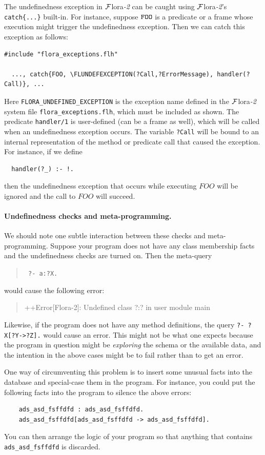 \documentclass[11pt]{article}
\newcommand{\FLSYSTEM}{{\mbox{\sc ${\cal F}${lora}\rm\emph{-2}}}\xspace}
\newcommand{\FLUNDEFEXCEPTION}{FLORA\_UNDEFINED\_EXCEPTION}
\newcommand{\errorsystem}{Flora-2}
\begin{document}
The undefinedness exception in \FLSYSTEM can be caught using \FLSYSTEM's {\tt
  catch\{...\}} built-in. For instance, suppose
$\tt FOO$ is a predicate or a frame whose execution might trigger the
undefinedness exception. Then we can catch this exception as follows:
\begin{verbatim}
#include "flora_exceptions.flh"

  ..., catch{FOO, \FLUNDEFEXCEPTION(?Call,?ErrorMessage), handler(?Call)}, ...
\end{verbatim}
Here {\tt \FLUNDEFEXCEPTION} is the exception name defined in the
\FLSYSTEM system file {\tt flora\_exceptions.flh}, which must be included as
shown.
The predicate {\tt handler/1} is user-defined (can be a frame as well),
which will be called when an undefinedness exception occurs. The variable
{\tt ?Call} will be bound to an internal representation of the method or
predicate call that caused the exception. For instance, if we define
\begin{verbatim}
  handler(?_) :- !.  
\end{verbatim}
then the undefinedness exception that occurs while executing $FOO$ will be
ignored and the call to $FOO$ will succeed.


\paragraph{Undefinedness checks and meta-programming.}
We should note one subtle interaction between these checks and
meta-programming. Suppose your program does not have any class membership
facts and the undefinedness checks are turned on. Then the meta-query
\begin{quote}
 {\tt
       ?- a:?X.
 }
\end{quote}
would cause the following error:
\begin{quote}
 ++Error[\errorsystem]: Undefined class ?:? in user module main  
\end{quote}
Likewise, if the program does not have any method definitions,
the query {\tt ?- ?X[?Y->?Z].} would cause an error. This might not
be what one expects because the program in question might be
\emph{exploring} the schema or the available data, and the intention in the
above cases might be to fail rather than to get an error.

One way of circumventing this problem is to insert some unusual facts into the
database and special-case them in the program. For instance, you could put
the following facts into the program to silence the above errors:
\begin{verbatim}
    ads_asd_fsffdfd : ads_asd_fsffdfd.
    ads_asd_fsffdfd[ads_asd_fsffdfd -> ads_asd_fsffdfd].
\end{verbatim}
You can then arrange the logic of your program so that anything that contains
{\tt ads\_asd\_fsffdfd} is discarded.
\end{document}
